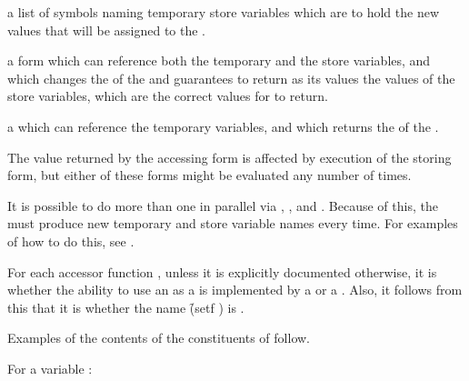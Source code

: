 a list of symbols naming temporary store variables which are
to hold the new values that will be assigned to the
.


a form which can reference both the temporary and the store variables,
and which changes the  of the 
and guarantees to return as its values the values of the store variables,
which are the correct values for  to return.


a  which can reference the temporary variables,
and which returns the  of the .
\endlist

The value returned by the accessing form is
affected by execution of the storing form, but either of these
forms might be evaluated any number of times.



It is possible
to do more than one  in parallel via
, , and .  
Because of this, the 
must produce new temporary 
and store variable names every time.  For examples of how to do this,
see .

For each  accessor function ,
unless it is explicitly documented otherwise,
it is  whether the ability to 
use an   as a  
is implemented by a  or a .
Also, it follows from this that it is  
whether the name \f{(setf )} is .


Examples of the contents of the constituents of 
follow.

For a variable :


